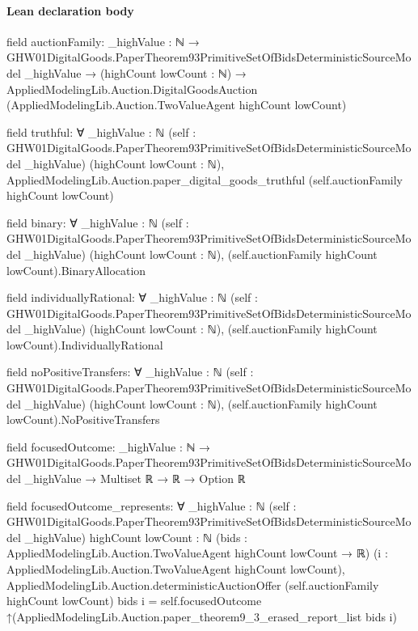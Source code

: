 \documentclass[10pt]{article}
\begin{document}
\paragraph{Lean declaration body}
\begin{ReviewVerbatim}
field auctionFamily:
{_highValue : ℕ} →
  GHW01DigitalGoods.PaperTheorem93PrimitiveSetOfBidsDeterministicSourceModel _highValue →
    (highCount lowCount : ℕ) →
      AppliedModelingLib.Auction.DigitalGoodsAuction (AppliedModelingLib.Auction.TwoValueAgent highCount lowCount)

field truthful:
∀ {_highValue : ℕ} (self : GHW01DigitalGoods.PaperTheorem93PrimitiveSetOfBidsDeterministicSourceModel _highValue)
  (highCount lowCount : ℕ),
  AppliedModelingLib.Auction.paper_digital_goods_truthful (self.auctionFamily highCount lowCount)

field binary:
∀ {_highValue : ℕ} (self : GHW01DigitalGoods.PaperTheorem93PrimitiveSetOfBidsDeterministicSourceModel _highValue)
  (highCount lowCount : ℕ), (self.auctionFamily highCount lowCount).BinaryAllocation

field individuallyRational:
∀ {_highValue : ℕ} (self : GHW01DigitalGoods.PaperTheorem93PrimitiveSetOfBidsDeterministicSourceModel _highValue)
  (highCount lowCount : ℕ), (self.auctionFamily highCount lowCount).IndividuallyRational

field noPositiveTransfers:
∀ {_highValue : ℕ} (self : GHW01DigitalGoods.PaperTheorem93PrimitiveSetOfBidsDeterministicSourceModel _highValue)
  (highCount lowCount : ℕ), (self.auctionFamily highCount lowCount).NoPositiveTransfers

field focusedOutcome:
{_highValue : ℕ} →
  GHW01DigitalGoods.PaperTheorem93PrimitiveSetOfBidsDeterministicSourceModel _highValue → Multiset ℝ → ℝ → Option ℝ

field focusedOutcome_represents:
∀ {_highValue : ℕ} (self : GHW01DigitalGoods.PaperTheorem93PrimitiveSetOfBidsDeterministicSourceModel _highValue)
  {highCount lowCount : ℕ} (bids : AppliedModelingLib.Auction.TwoValueAgent highCount lowCount → ℝ)
  (i : AppliedModelingLib.Auction.TwoValueAgent highCount lowCount),
  AppliedModelingLib.Auction.deterministicAuctionOffer (self.auctionFamily highCount lowCount) bids i =
    self.focusedOutcome ↑(AppliedModelingLib.Auction.paper_theorem9_3_erased_report_list bids i)
\end{ReviewVerbatim}
\end{document}
